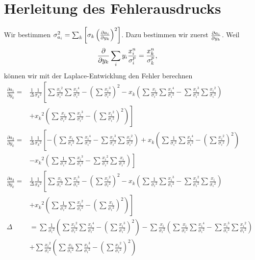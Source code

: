 \documentclass[prb,12pt]{revtex4-2}
\theoremstyle{definition}
\theoremstyle{definition}
\begin{document}
\section{Herleitung des Fehlerausdrucks}
	Wir bestimmen $\sigma_{a_i}^2=\sum_k \left[\sigma_k \left(\pdv{a_i}{y_k}\right)^2\right]$. Dazu bestimmen wir zuerst $\pdv{a_i}{y_k}$. Weil
	\[\pdv{y_k}\sum_i y_i \frac{x_i^n}{\sigma_i^p}=\frac{x_k^n}{\sigma_k^p},\]
	können wir mit der Laplace-Entwicklung den Fehler berechnen
	\begin{align*}
		\frac{\partial a_1}{\partial y_k}=&\frac{1}{\Delta}\frac{1}{{\sigma_k}^2}\left[\sum \frac{{x_i}^2}{{\sigma_i}^2}\sum \frac{{x_i}^4}{{\sigma_i}^2}-\left(\sum \frac{{x_i}^3}{{\sigma_i}^2}\right)^2 
		- x_k\left(\sum \frac{{x_i}}{{\sigma_i}^2}\sum \frac{{x_i}^4}{{\sigma_i}^2}-\sum \frac{{x_i}^3}{{\sigma_i}^2}\sum \frac{{x_i}^2}{{\sigma_i}^2}\right)\right.\\
		&\left. +{x_k}^2\left(\sum \frac{{x_i}}{{\sigma_i}^2}\sum \frac{{x_i}^3}{{\sigma_i}^2}-\left(\sum \frac{{x_i}^2}{{\sigma_i}^2}\right)^2\right)\right]\\
		\frac{\partial a_2}{\partial y_k}=&\frac{1}{\Delta}\frac{1}{{\sigma_k}^2}\left[-\left(\sum \frac{{x_i}}{{\sigma_i}^2}\sum \frac{{x_i}^4}{{\sigma_i}^2}-\sum \frac{{x_i}^3}{{\sigma_i}^2}\sum \frac{{x_i}^2}{{\sigma_i}^2}\right)
		+ x_k\left(\sum \frac{1}{{\sigma_i}^2}\sum \frac{{x_i}^4}{{\sigma_i}^2}-\left(\sum \frac{{x_i}^2}{{\sigma_i}^2}\right)^2 \right)\right.\\
		&\left.-{x_k}^2\left(\sum \frac{{1}}{{\sigma_i}^2}\sum \frac{{x_i}^3}{{\sigma_i}^2}-\sum \frac{{x_i}^2}{{\sigma_i}^2}\sum \frac{{x_i}}{{\sigma_i}^2}\right)\right]\\
		\frac{\partial a_3}{\partial y_k}=&\frac{1}{\Delta}\frac{1}{{\sigma_k}^2}\left[\sum \frac{{x_i}}{{\sigma_i}^2}\sum \frac{{x_i}^3}{{\sigma_i}^2}-\left(\sum \frac{{x_i}^2}{{\sigma_i}^2}\right)^2 
		- x_k\left(\sum \frac{{1}}{{\sigma_i}^2}\sum \frac{{x_i}^3}{{\sigma_i}^2}-\sum \frac{{x_i}^2}{{\sigma_i}^2}\sum \frac{{x_i}}{{\sigma_i}^2}\right)\right.\\
		&\left.+{x_k}^2\left(\sum \frac{{1}}{{\sigma_i}^2}\sum \frac{{x_i}^2}{{\sigma_i}^2}-\left(\sum \frac{{x_i}}{{\sigma_i}^2}\right)^2\right)\right]\\
		\Delta&=\sum\frac{1}{{\sigma_i}^2}\left(\sum\frac{{x_i}^2}{{\sigma_i}^2}\sum \frac{{x_i}^4}{{\sigma_i}^2}-\left(\sum \frac{{x_i}^3}{{\sigma_i}^2}\right)^2\right) 
		- \sum\frac{{x_i}}{{\sigma_i}^2}\left(\sum \frac{{x_i}}{{\sigma_i}^2}\sum \frac{{x_i}^4}{{\sigma_i}^2}-\sum \frac{{x_i}^3}{{\sigma_i}^2}\sum \frac{{x_i}^2}{{\sigma_i}^2}\right)\\&+
		\sum\frac{{x_i}^2}{{\sigma_i}^2}\left(\sum \frac{{x_i}}{{\sigma_i}^2}\sum \frac{{x_i}^3}{{\sigma_i}^2}-\left(\sum \frac{{x_i}^2}{{\sigma_i}^2}\right)^2\right)
	\end{align*}
\end{document}
